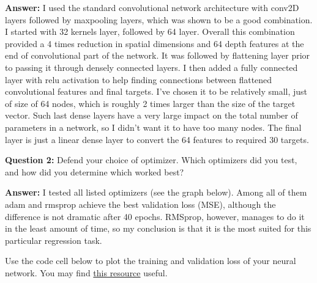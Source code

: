\documentclass[11pt]{article}
\begin{document}
\textbf{Answer:} I used the standard convolutional network architecture
with conv2D layers followed by maxpooling layers, which was shown to be
a good combination. I started with 32 kernels layer, followed by 64
layer. Overall this combination provided a 4 times reduction in spatial
dimensions and 64 depth features at the end of convolutional part of the
network. It was followed by flattening layer prior to passing it through
densely connected layers. I then added a fully connected layer with relu
activation to help finding connections between flattened convolutional
features and final targets. I've chosen it to be relatively small, just
of size of 64 nodes, which is roughly 2 times larger than the size of
the target vector. Such last dense layers have a very large impact on
the total number of parameters in a network, so I didn't want it to have
too many nodes. The final layer is just a linear dense layer to convert
the 64 features to required 30 targets.

\textbf{Question 2:} Defend your choice of optimizer. Which optimizers
did you test, and how did you determine which worked best?

\textbf{Answer:} I tested all listed optimizers (see the graph below).
Among all of them adam and rmsprop achieve the best validation loss
(MSE), although the difference is not dramatic after 40 epochs. RMSprop,
however, manages to do it in the least amount of time, so my conclusion
is that it is the most suited for this particular regression task.

Use the code cell below to plot the training and validation loss of your
neural network. You may find
\href{http://machinelearningmastery.com/display-deep-learning-model-training-history-in-keras/}{this
resource} useful.
\end{document}
